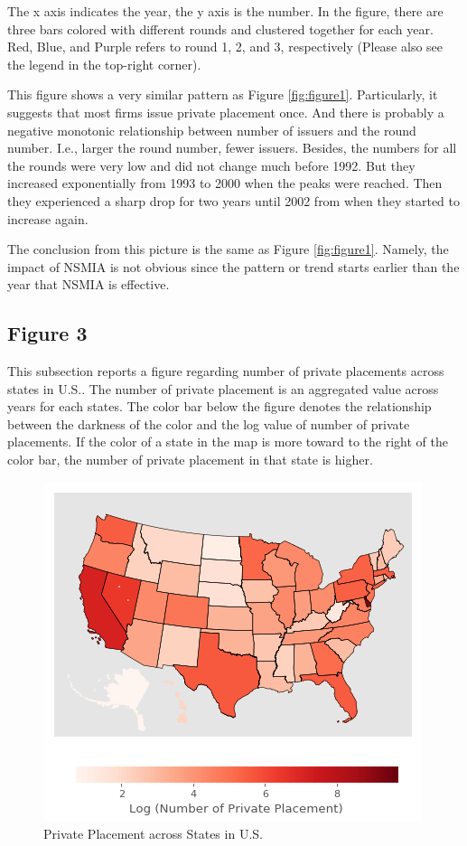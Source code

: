 \documentclass[letterpaper,12pt]{article}
\theoremstyle{definition}
\begin{document}
The x axis indicates the year, the y axis is the number. In the figure, there are three bars colored with different rounds and clustered together for each year. Red, Blue, and Purple refers to round 1, 2, and 3, respectively (Please also see the legend in the top-right corner).

This figure shows a very similar pattern as Figure \ref{fig:figure1}. Particularly, it suggests that most firms issue private placement once. And there is probably a negative monotonic relationship between number of issuers and the round number. I.e., larger the round number, fewer issuers. Besides, the numbers for all the rounds were very low and did not change much before 1992. But they increased exponentially from 1993 to 2000 when the peaks were reached. Then they experienced a sharp drop for two years until 2002 from when they started to increase again.

The conclusion from this picture is the same as Figure \ref{fig:figure1}. Namely, the impact of NSMIA is not obvious since the pattern or trend starts earlier than the year that NSMIA is effective.


\subsection{Figure 3}

This subsection reports a figure regarding number of private placements across states in U.S.. The number of private placement is an aggregated value across years for each states. The color bar below the figure denotes the relationship between the darkness of the color and the log value of number of private placements. If the color of a state in the map is more toward to the right of the color bar, the number of private placement in that state is higher.

\begin{figure}[h]
	\centering
	\includegraphics[width=\textwidth]{figure3}
	\caption{Private Placement across States in U.S.}
	\label{fig:figure3}
\end{figure}
\end{document}
